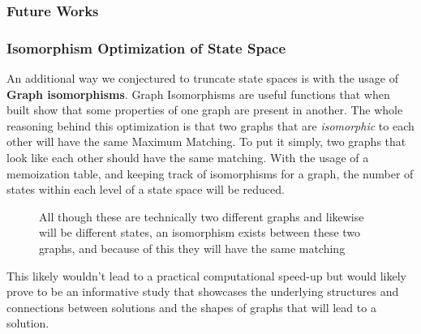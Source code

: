 \subsubsection*{Future Works}
\subsubsection*{Isomorphism Optimization of State Space}

An additional way we conjectured to truncate state spaces is with the usage of \textbf{Graph isomorphisms}. Graph Isomorphisms are useful functions that when built show that some properties of one graph are present in another. The whole reasoning behind this optimization is that two graphs that are \textit{isomorphic} to each other will have the same Maximum Matching. To put it simply, two graphs that look like each other should have the same matching. 
With the usage of a memoization table, and keeping track of isomorphisms for a graph, the number of states within each level of a state space will be reduced.


\begin{figure}[ht]

\begin{center}
    
\hspace{3cm}
\end{center}

 \caption{All though these are technically two different graphs and likewise will be different states, an isomorphism exists between these two graphs, and because of this they will have the same matching}

\end{figure}

\noindent This likely wouldn't lead to a practical computational speed-up but would likely prove to be an informative study that showcases the underlying structures and connections between solutions and the shapes of graphs that will lead to a solution.

